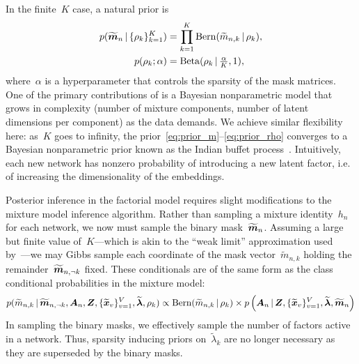In the finite~$K$ case, a natural prior is
\begin{align}
  \label{eq:prior_m}
  p(\widetilde{\boldsymbol{m}}_n \, | \, \{\rho_k\}_{k=1}^K)
  &=\prod_{k=1}^K \mathrm{Bern}(\widetilde{m}_{n,k} \, | \, \rho_k), \\
  \label{eq:prior_rho}
  p(\rho_k; \alpha) &= \mathrm{Beta}(\rho_k \, | \, \tfrac{\alpha}{K}, 1), 
\end{align}
where~$\alpha$ is a hyperparameter that controls the sparsity of the
mask matrices.  One of the primary contributions of
\citet{durante2016nonparametric} is a Bayesian nonparametric model
that grows in complexity (number of mixture components, number of
latent dimensions per component) as the data demands.
We achieve similar flexibility here: as~$K$ goes to infinity, the 
prior~\eqref{eq:prior_m}--\eqref{eq:prior_rho} converges to a Bayesian
nonparametric prior known as the Indian buffet process~\citep{griffiths2005infinite}.
Intuitively, each new network has nonzero probability of introducing a
new latent factor, i.e. of increasing the dimensionality of the
embeddings.

Posterior inference in the factorial model requires slight
modifications to the mixture model inference algorithm. Rather than
sampling a mixture identity~$h_n$ for each network, we now must sample
the binary mask~$\widetilde{\boldsymbol{m}}_n$. Assuming a large but finite
value of~$K$---which is akin to the ``weak limit'' approximation used
by~\citet{durante2016nonparametric}---we may Gibbs sample each
coordinate of the mask vector~$\widetilde{m}_{n,k}$ holding the
remainder~$\widetilde{\boldsymbol{m}}_{n,\neg k}$ fixed.  These conditionals are
of the same form as the class conditional probabilities in the mixture
model:
\begin{multline}
  p(\widetilde{m}_{n,k} \, | \, \widetilde{\boldsymbol{m}}_{n, \neg k}, \boldsymbol{A}_n, \boldsymbol{Z},
  \{\widetilde{\boldsymbol{x}}_v\}_{v=1}^V, \widetilde{\boldsymbol{\lambda}},\rho_k) 
  \propto \mathrm{Bern}(\widetilde{m}_{n,k} \, | \, \rho_k) \times
  p\left(\boldsymbol{A}_n \, | \,
  \boldsymbol{Z}, \{\widetilde{\boldsymbol{x}}_v\}_{v=1}^V,
  \widetilde{\boldsymbol{\lambda}}, \widetilde{\boldsymbol{m}}_n \right) 
\end{multline}
In sampling the binary masks, we effectively sample the number of
factors active in a network.  Thus, sparsity inducing priors
on~$\widetilde{\lambda}_k$ are no longer necessary as they are
superseded by the binary masks.

